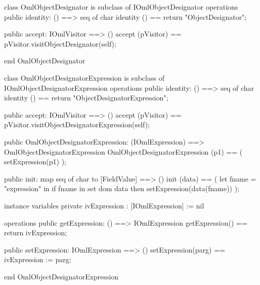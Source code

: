 \begin{vdm_al}
class OmlObjectDesignator is subclass of IOmlObjectDesignator
operations
  public identity: () ==> seq of char
  identity () == return "ObjectDesignator";

  public accept: IOmlVisitor ==> ()
  accept (pVisitor) == pVisitor.visitObjectDesignator(self);

end OmlObjectDesignator
\end{vdm_al}
\begin{vdm_al}
class OmlObjectDesignatorExpression is subclass of IOmlObjectDesignatorExpression
operations
  public identity: () ==> seq of char
  identity () == return "ObjectDesignatorExpression";

  public accept: IOmlVisitor ==> ()
  accept (pVisitor) == pVisitor.visitObjectDesignatorExpression(self);

  public OmlObjectDesignatorExpression:
      (IOmlExpression) ==> OmlObjectDesignatorExpression
  OmlObjectDesignatorExpression (p1) == 
   ( setExpression(p1) );

  public init: map seq of char to [FieldValue] ==> ()
  init (data) ==
    ( let fname = "expression" in
        if fname in set dom data
        then setExpression(data(fname)) );

instance variables
  private ivExpression : [IOmlExpression] := nil

operations
  public getExpression: () ==> IOmlExpression
  getExpression() == return ivExpression;

  public setExpression: IOmlExpression ==> ()
  setExpression(parg) == ivExpression := parg;

end OmlObjectDesignatorExpression
\end{vdm_al}

